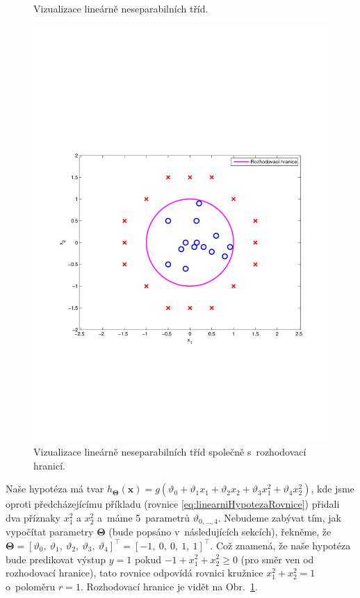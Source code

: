 \begin{figure}[!ht]
\begin{minipage}[t]{0.48\textwidth}
		\caption{Vizualizace lineárně neseparabilních tříd.}
		\label{fig:decisionBoundary3}
	\end{minipage}%
	\hfill
	\begin{minipage}[t]{0.48\textwidth}
		\includegraphics[width = \textwidth, trim = 2.5cm 7cm 2cm 9cm]{./Img/BinarniRegrese/decisionBoundary/decisionBoundary4.pdf}
		\caption{Vizualizace lineárně neseparabilních tříd společně s~rozhodovací hranicí.}
		\label{fig:decisionBoundary4}
	\end{minipage}%
\end{figure}

\par{Naše hypotéza má tvar $h_{\bm{\Theta}} \left( \bm{x} \right) = g \left( \vartheta_0 + \vartheta_1 x_1 + \vartheta_2 x_2 + \vartheta_3 x_1^2 + \vartheta_4 x_2^2 \right)$, kde jsme oproti předcházejícímu příkladu (rovnice \ref{eq:linearniHypotezaRovnice}) přidali dva příznaky $x_1^2$ a $x_2^2$ a~máme 5~parametrů $\vartheta_{0,\ldots,4}$. Nebudeme zabývat tím, jak vypočítat parametry $\bm{\Theta}$ (bude popsáno v~následujících sekcích), řekněme, že $\bm{\Theta} = \left[ \vartheta_0,~\vartheta_1,~\vartheta_2,~\vartheta_3,~\vartheta_4 \right]^{\top} = \left[ -1,~0,~0,~1,~1 \right]^{\top}$. Což znamená, že naše hypotéza bude predikovat výstup $y = 1$ pokud $-1 + x_1^2 + x_2^2 \geq 0$ (pro směr ven od rozhodovací hranice), tato rovnice odpovídá rovnici kružnice $x_1^2 + x_2^2 = 1$ o~poloměru $r = 1$. Rozhodovací hranice je vidět na Obr.~\ref{fig:decisionBoundary4}.}

